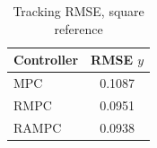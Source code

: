 \begin{table}[t]
\centering
\caption{Tracking RMSE, square reference}
\label{tab:rmse_duffing_square_mpc_rmpc_rampc}
\begin{tabular}{lc}
\toprule
Controller & RMSE $y$ \\
\midrule
MPC & 0.1087 \\
RMPC & 0.0951 \\
RAMPC & 0.0938 \\
\bottomrule
\end{tabular}
\end{table}
